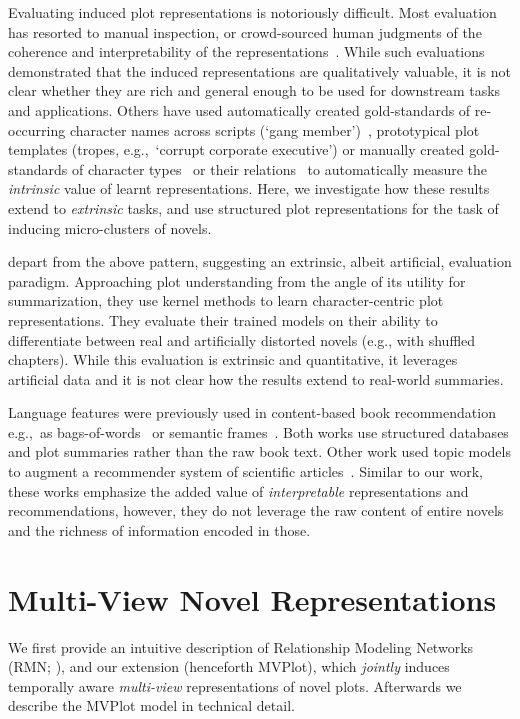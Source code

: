\documentclass[11pt,letterpaper]{article}
\begin{document}
Evaluating induced plot representations is notoriously difficult. Most evaluation has resorted to manual inspection, or crowd-sourced human judgments of the coherence and interpretability of the representations~\cite{Iyyer:2016,Chaturvedi:2017}. While such evaluations demonstrated that the induced representations are qualitatively valuable, it is not clear whether they are rich and general enough to be used for downstream tasks and applications. 
Others have used automatically created gold-standards of re-occurring character names across scripts (`gang member')~\cite{Bamman:2013}, prototypical plot
templates (tropes, e.g.,~`corrupt corporate executive') or manually created gold-standards of character types~\citep{Vala:2016} or their relations~\cite{Massey:2015,Chaturvedi:2017} to automatically measure the {\it intrinsic} value of learnt representations. 
Here, we investigate how these results extend to {\it extrinsic} tasks, and use structured plot representations for the task of inducing micro-clusters of novels. 

 depart from the above pattern, suggesting an extrinsic, albeit artificial, evaluation paradigm. Approaching plot understanding from the angle of its utility for summarization, they use kernel methods to learn character-centric plot representations. They evaluate their trained models on their ability to differentiate between real and artificially distorted novels (e.g., with shuffled chapters). While this evaluation is extrinsic and quantitative, it leverages artificial data and it is not clear how the results extend to real-world summaries.

Language features were previously used in content-based book recommendation e.g.,~as bags-of-words~\citep{Mooney:1999} or semantic frames~\citep{Clercq:2014}. Both works use structured databases and plot summaries rather than the raw book text. Other work used topic models to augment a recommender system of scientific articles~\citep{Wang:2011}. Similar to our work, these works emphasize the added value of {\it interpretable} representations and recommendations, however, they do not leverage the raw content of entire novels and the richness of information encoded in those.

\section{Multi-View Novel Representations}
\label{sec-mvplot}
We first provide an intuitive description of Relationship Modeling Networks (RMN; \citealt{Iyyer:2016}), and our extension (henceforth \mbox{MVPlot}), which {\it jointly} induces temporally aware {\it multi-view} representations of novel plots. Afterwards we describe the \mbox{MVPlot} model in technical detail.
\end{document}

